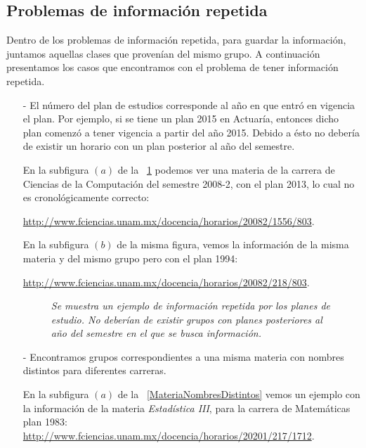\subsection{Problemas de información repetida}

Dentro de los problemas de información repetida, para guardar la información, juntamos aquellas clases que provenían del mismo grupo. A continuación presentamos los casos que encontramos con el problema de tener información repetida.

\begin{itemize}
\item[-] El número del plan de estudios corresponde al año en que entró en vigencia el plan. Por ejemplo, si se tiene un plan 2015 en Actuaría, entonces dicho plan comenzó a tener vigencia a partir del año 2015. Debido a ésto no debería de existir un horario con un plan posterior al año del semestre.

En la subfigura $(a)$ de la \figurename{~\ref{planRepetido}} podemos ver una materia de la carrera de Ciencias de la Computación del semestre 2008-2, con el plan 2013, lo cual no es cronológicamente correcto:

\url{http://www.fciencias.unam.mx/docencia/horarios/20082/1556/803}.

En la subfigura $(b)$ de la misma figura, vemos la información de la misma materia y del mismo grupo pero con el plan 1994:

\url{http://www.fciencias.unam.mx/docencia/horarios/20082/218/803}.

\begin{figure}[H]
\centering
{} %
	\caption[\textit{Información repetida: Planes de estudio}]{\textit{Se muestra un ejemplo de información repetida por los planes de estudio. No deberían de existir grupos con planes posteriores al año del semestre en el que se busca información.}}\label{planRepetido}
\end{figure}

\item[-] Encontramos grupos correspondientes a una misma materia con nombres distintos para diferentes carreras.

En la subfigura $(a)$ de la \figurename{~\ref{MateriaNombresDistintos}} vemos un ejemplo con la información de la materia \textit{Estadística III}, para la carrera de Matemáticas plan 1983: \url{http://www.fciencias.unam.mx/docencia/horarios/20201/217/1712}.


\end{itemize}
